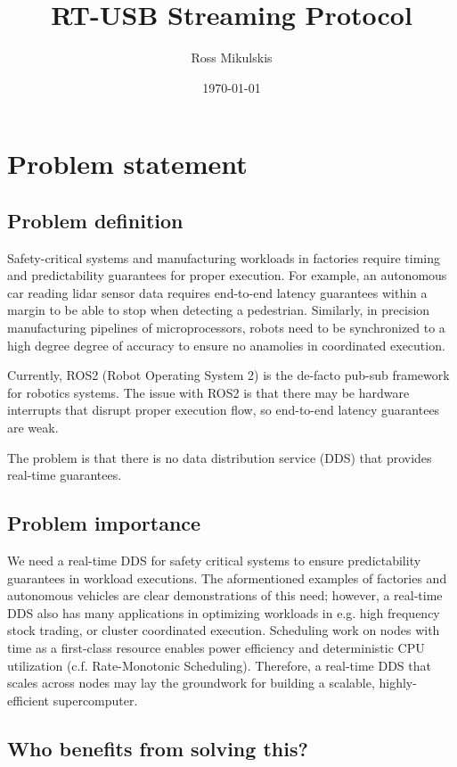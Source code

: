 \documentclass[11pt]{article}
\author{Ross Mikulskis}
\date{\today}
\title{RT-USB Streaming Protocol}
\begin{document}
\maketitle
\tableofcontents

\section{Problem statement}
\label{sec:org0919e67}
\subsection{Problem definition}
\label{sec:orgc28f8f3}
Safety-critical systems and manufacturing workloads in factories require
timing and predictability guarantees for proper execution. For example, an
autonomous car reading lidar sensor data requires end-to-end latency guarantees
within a margin to be able to stop when detecting a pedestrian. Similarly, in
precision manufacturing pipelines of microprocessors, robots need to be
synchronized to a high degree degree of accuracy to ensure no anamolies in
coordinated execution.

Currently, ROS2 (Robot Operating System 2) is the de-facto pub-sub framework for
robotics systems. The issue with ROS2 is that there may be hardware interrupts
that disrupt proper execution flow, so end-to-end latency guarantees are
weak.

The problem is that there is no data distribution service (DDS) that provides
real-time guarantees.
\subsection{Problem importance}
\label{sec:org5764cb9}
We need a real-time DDS for safety critical systems to ensure predictability
guarantees in workload executions. The aformentioned examples of factories and
autonomous vehicles are clear demonstrations of this need; however, a real-time
DDS also has many applications in optimizing workloads in e.g. high frequency
stock trading, or cluster coordinated execution. Scheduling work on nodes with
time as a first-class resource enables power efficiency and deterministic CPU
utilization (c.f. Rate-Monotonic Scheduling). Therefore, a real-time DDS that
scales across nodes may lay the groundwork for building a scalable,
highly-efficient supercomputer.
\subsection{Who benefits from solving this?}
\label{sec:orge2b0673}
\end{document}
